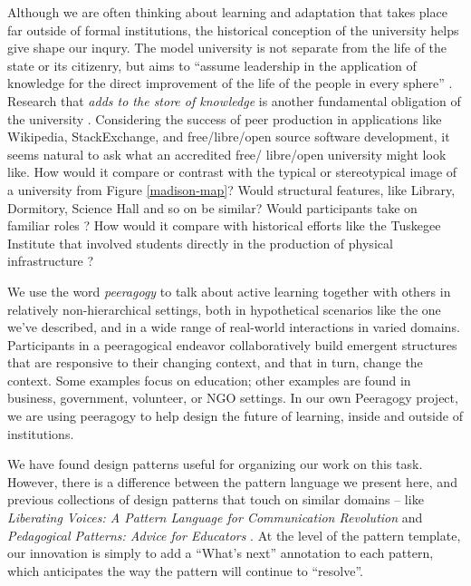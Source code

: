 Although we are often thinking about learning and adaptation that
takes place far outside of formal institutions, the historical
conception of the university helps give shape our inqury.
%
The model university is not separate from the life of the state or its
citizenry, but aims to ``assume leadership in the application of
knowledge for the direct improvement of the life of the people in
every sphere'' \cite[p.~88]{curti1949university}. Research that
\emph{adds to the store of knowledge} is another fundamental
obligation of the university \cite[p.~550]{curti1949university}.
%
Considering the success of peer production in applications like
Wikipedia, StackExchange, and free/libre/open source software
development, it seems natural to ask what an accredited free\slash
libre\slash open university might look like.  How would it compare or
contrast with the typical or stereotypical image of a university from
Figure \ref{madison-map}?  Would structural features, like Library,
Dormitory, Science Hall and so on be similar?  Would participants take
on familiar roles \cite{corneli+crowdsourcing}?  How would it compare
with historical efforts like the Tuskegee Institute that involved
students directly in the production of physical infrastructure
\cite{building-peeragogy-accelerator}?

We use the word \emph{peeragogy} to talk about active learning
together with others in relatively non-hierarchical settings, both in
hypothetical scenarios like the one we've described, and in a wide
range of real-world interactions in varied domains.  Participants in a
peeragogical endeavor collaboratively build emergent structures that
are responsive to their changing context, and that in turn, change the
context.  Some examples focus on education; other examples are found
in business, government, volunteer, or NGO settings.  In our own
Peeragogy project, we are using peeragogy to help design the future of
learning, inside and outside of institutions.

We have found design patterns useful for organizing our work on this task.  However, there is a difference between the pattern language we present here, and previous collections of design patterns that touch on similar domains -- like \emph{Liberating Voices: A Pattern Language for Communication Revolution} \cite{schuler2008liberating} and \emph{Pedagogical Patterns: Advice for Educators} \cite{bergin2012pedagogical}.  At the level of the pattern template, our innovation is simply to add a ``What's next'' annotation to each pattern, which anticipates the way the pattern will continue to ``resolve''. 

